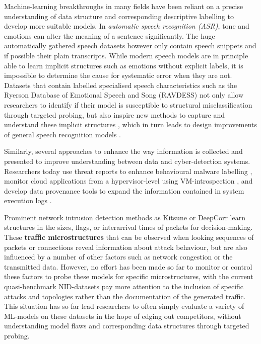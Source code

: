 \documentclass[runningheads]{llncs}
\begin{document}
Machine-learning breakthroughs in many fields have been reliant on a precise understanding of data structure and corresponding descriptive labelling to develop more suitable models.
In \textit{automatic speech recognition (ASR)}, tone and emotions can alter the meaning of a sentence significantly. The huge automatically gathered speech datasets however only contain speech snippets and if possible their plain transcripts. While modern speech models are in principle able to learn implicit structures such as emotions without explicit labels, it is impossible to determine the cause for systematic error when they are not. Datasets that contain labelled specialised speech characteristics such as the Ryerson Database of Emotional Speech and Song (RAVDESS) \cite{livingstone2018ryerson} not only allow researchers to identify if their model is susceptible to structural misclassification through targeted probing, but also inspire new methods to capture and understand these implicit structures \cite{haque2019audio}, which in turn leads to design improvements of general speech recognition models \cite{kamper2020multilingual}.


Similarly, several approaches to enhance the way information is collected and presented to improve understanding between data and cyber-detection systems. Researchers today use threat reports to enhance behavioural malware labelling \cite{smith2020mind}, monitor cloud applications from a hypervisor-level using VM-introspection \cite{dolan2011virtuoso}, and develop data provenance tools to expand the information contained in system execution logs \cite{barre2019mining}. 

Prominent network intrusion detection methods as Kitsune \cite{mirsky2018kitsune} or DeepCorr \cite{nasr2018deepcorr} learn structures in the sizes, flags, or interarrival times of packets for decision-making. These \textbf{traffic microstructures} that can be observed when looking sequences of packets or connections reveal information about attack behaviour, but are also influenced by a number of other factors such as network congestion or the transmitted data. However, no effort has been made so far to monitor or control these factors to probe these models for specific microstructures, with the current quasi-benchmark NID-datasets pay more attention to the inclusion of specific attacks and topologies rather than the documentation of the generated traffic. 
This situation has so far lead researchers to often simply evaluate a variety of ML-models on these datasets in the hope of edging out competitors, without understanding model flaws and corresponding data structures through targeted probing.
\end{document}
